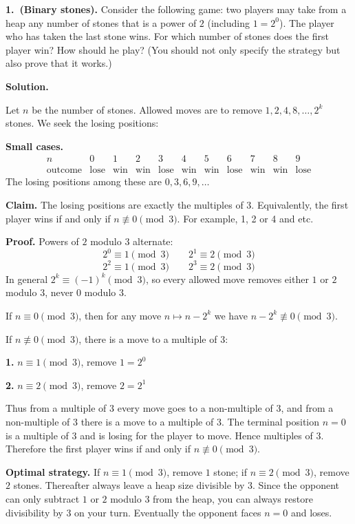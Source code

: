 \textbf{1.\ (Binary stones).}
Consider the following game: two players may take from a heap any number of stones that is a power of \(2\) (including \(1 = 2^0\)).
The player who has taken the last stone wins.
For which number of stones does the first player win?
How should he play?
(You should not only specify the strategy but also prove that it works.)

\textbf{Solution.}

Let \(n\) be the number of stones.
Allowed moves are to remove \(1, 2, 4, 8, \dots, 2^k\) stones.
We seek the losing positions:

\medskip
\noindent\textbf{Small cases.}
\[
\begin{array}{c|cccccccccc}
n & 0 & 1 & 2 & 3 & 4 & 5 & 6 & 7 & 8 & 9\\\hline
\text{outcome} & \text{lose} & \text{win} & \text{win} & \text{lose} & \text{win} & \text{win} & \text{lose} & \text{win} & \text{win} & \text{lose}
\end{array}
\]
The losing positions among these are \(0, 3, 6, 9, \dots\)

\medskip
\noindent\textbf{Claim.}
The losing positions are exactly the multiples of \(3\).
Equivalently, the first player wins if and only if \(n \not\equiv 0 \pmod{3}\). For example, 1, 2 or 4 and etc.

\medskip
\noindent\textbf{Proof.}
Powers of \(2\) modulo \(3\) alternate:
\[
2^0 \equiv 1\pmod{3} \qquad 2^1 \equiv 2\pmod{3}
\]
\[
2^2 \equiv 1 \pmod{3} \qquad 2^3 \equiv 2 \pmod{3}
\]
In general \(2^k \equiv (-1)^k \pmod{3}\), so every allowed move removes either \(1\) or \(2\) modulo \(3\), never \(0\) modulo \(3\).

\smallskip
If \(n \equiv 0 \pmod{3}\), then for any move \(n \mapsto n - 2^k\) we have \(n - 2^k \not\equiv 0 \pmod{3}\).

If \(n \not\equiv 0 \pmod{3}\), there is a move to a multiple of \(3\):

\begin{center}

\noindent\textbf{1.} \(n \equiv 1 \pmod{3}\), remove \(1 = 2^0\)

\noindent\textbf{2.} \(n \equiv 2 \pmod{3}\), remove \(2 = 2^1\)

\end{center}

Thus from a multiple of \(3\) every move goes to a non-multiple of \(3\), and from a non-multiple of \(3\) there is a move to a multiple of \(3\).
The terminal position \(n = 0\) is a multiple of \(3\) and is losing for the player to move.
Hence multiples of \(3\). Therefore the first player wins if and only if \(n \not\equiv 0 \pmod{3}\).

\medskip
\noindent\textbf{Optimal strategy.}
If \(n \equiv 1 \pmod{3}\), remove \(1\) stone; if \(n \equiv 2 \pmod{3}\), remove \(2\) stones.
Thereafter always leave a heap size divisible by \(3\).
Since the opponent can only subtract \(1\) or \(2\) modulo \(3\) from the heap, you can always restore divisibility by \(3\) on your turn.
Eventually the opponent faces \(n = 0\) and loses.
